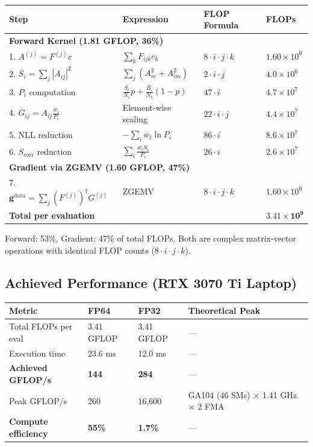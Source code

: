 \documentclass[11pt,a4paper]{article}
\begin{document}
\begin{center}
\begin{tabular}{@{}llll@{}}
\toprule
\textbf{Step} & \textbf{Expression} & \textbf{FLOP Formula} & \textbf{FLOPs} \\ \midrule
\multicolumn{4}{l}{\textbf{Forward Kernel (1.81 GFLOP, 36\%)}} \\
1. $A^{(j)} = F^{(j)} c$ & $\sum_k F_{ijk} c_k$ & $8 \cdot i \cdot j \cdot k$ & $1.60 \times 10^9$ \\
2. $S_i = \sum_j |A_{ij}|^2$ & $\sum_j (A_{re}^2 + A_{im}^2)$ & $2 \cdot i \cdot j$ & $4.0 \times 10^6$ \\
3. $P_i$ computation & $\frac{S_i}{N_s} p + \frac{B_i}{N_b}(1-p)$ & $47 \cdot i$ & $4.7 \times 10^7$ \\
4. $G_{ij} = A_{ij} \frac{w_i}{P_i}$ & Element-wise scaling & $22 \cdot i \cdot j$ & $4.4 \times 10^7$ \\
5. NLL reduction & $-\sum_i w_i \ln P_i$ & $86 \cdot i$ & $8.6 \times 10^7$ \\
6. $S_{\text{corr}}$ reduction & $\sum_i \frac{w_i S_i}{P_i}$ & $26 \cdot i$ & $2.6 \times 10^7$ \\ \midrule
\multicolumn{4}{l}{\textbf{Gradient via ZGEMV (1.60 GFLOP, 47\%)}} \\
7. $\mathbf{g}^{\text{data}} = \sum_j (F^{(j)})^\dagger G^{(j)}$ & ZGEMV & $8 \cdot i \cdot j \cdot k$ & $1.60 \times 10^9$ \\ \midrule
\textbf{Total per evaluation} & & & $\mathbf{3.41 \times 10^9}$ \\ \bottomrule
\end{tabular}
\end{center}

Forward: 53\%, Gradient: 47\% of total FLOPs. Both are complex matrix-vector operations with identical FLOP counts ($8 \cdot i \cdot j \cdot k$).

\subsection{Achieved Performance (RTX 3070 Ti Laptop)}

\begin{center}
\begin{tabular}{@{}llll@{}}
\toprule
\textbf{Metric} & \textbf{FP64} & \textbf{FP32} & \textbf{Theoretical Peak} \\ \midrule
Total FLOPs per eval & 3.41 GFLOP & 3.41 GFLOP & --- \\
Execution time & 23.6 ms & 12.0 ms & --- \\
\textbf{Achieved GFLOP/s} & \textbf{144} & \textbf{284} & --- \\
Peak GFLOP/s & 260 & 16,600 & GA104 (46 SMs) $\times$ 1.41 GHz $\times$ 2 FMA \\
\textbf{Compute efficiency} & \textbf{55\%} & \textbf{1.7\%} & --- \\ \bottomrule
\end{tabular}
\end{center}
\end{document}
